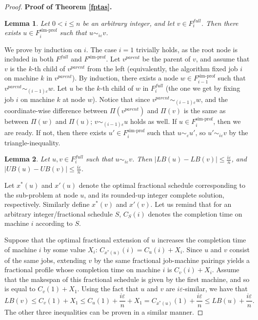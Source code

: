 \documentclass[moor,sglanonrev]{informs4}
\theoremstyle{plain}
\newtheorem{lmm}{Lemma}  %
\begin{document}
\begin{proof}{\textbf{Proof of Theorem \ref{fptas}.}}
    \begin{lmm}\label{i_eps}
        Let $0 < i \le n$ be an arbitrary integer, and let $v\in F^{full}_i$. Then there exists $u \in F^{\text{sim-prof}}_i$ such that $u \sim_{i\varepsilon} v$.
    \end{lmm}
    
        We prove by induction on $i$. The case $i=1$ trivially holds, as the root node is included in both $F^{full}$ and $F^{\text{sim-prof}}$. Let $v^{parent}$ be the parent of $v$, and assume that $v$ is the $k$-th child of $v^{parent}$ from the left (equivalently, the algorithm fixed job $i$ on machine $k$ in $v^{parent}$). By induction, there exists a node $w \in F^{\text{sim-prof}}_{i-1}$ such that $v^{parent} \sim_{(i-1)\varepsilon} w$. Let $u$ be the $k$-th child of $w$ in $F^{full}_i$ (the one we get by fixing job $i$ on machine $k$ at node $w$). Notice that since $v^{parent} \sim_{(i-1)\varepsilon} w$, and the coordinate-wise difference between $\Pi(v^{parent})$ and $\Pi(v)$ is the same as between $\Pi(w)$ and $\Pi(u)$; $v \sim_{(i-1)\varepsilon} u$ holds as well. If $u\in F^{\text{sim-prof}}_i$, then we are ready. If not, then there exists $u' \in F^{\text{sim-prof}}_i$ such that $u \sim_{\varepsilon} u'$, so $u' \sim_{i\varepsilon} v$ by the triangle-inequality. \hfill \Halmos
    \endproof

    \begin{lmm}\label{similar_lb}
        Let $u, v \in F^{full}_i$ such that $u \sim_{i\varepsilon} v$. Then $|LB(u)-LB(v)| \le \frac{i\varepsilon}{n}$, and $|UB(u)-UB(v)| \le \frac{i\varepsilon}{n}$.
    \end{lmm}

        Let $x^*(u)$ and $x'(u)$ denote the optimal fractional schedule corresponding to the sub-problem at node $u$, and its rounded-up integer complete solution, respectively. Similarly define $x^*(v)$ and $x'(v)$. Let us remind that for an arbitrary integer/fractional schedule $S$, $C_S(i)$ denotes the completion time on machine $i$ according to $S$.

        Suppose that the optimal fractional extension of $u$ increases the completion time of machine $i$ by some value $X_i$: $C_{x^*(u)}(i) = C_u (i) + X_i$. Since $u$ and $v$ consist of the same jobs, extending $v$ by the same fractional job-machine pairings yields a fractional profile whose completion time on machine $i$ is $C_v(i) + X_i$. Assume that the makespan of this fractional schedule is given by the first machine, and so is equal to $C_v (1) + X_1$. Using the fact that $u$ and $v$ are $i\varepsilon$-similar, we have that
        \[
        LB(v) \le C_v(1) + X_1 \le C_u(1) + \frac{i\varepsilon}{n} + X_1 = C_{x^*(u)}(1) + \frac{i\varepsilon}{n} \le LB(u) + \frac{i\varepsilon}{n}. 
        \]
        The other three inequalities can be proven in a similar manner. \hfill \Halmos
    \endproof


\end{proof}
\end{document}
